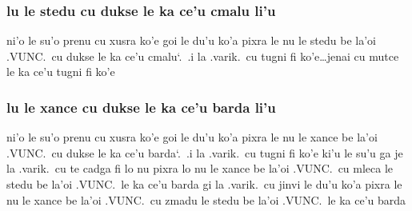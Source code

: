 \documentclass{report}
\newcommand\sds{\spacefactor\sfcode`.\ \space}
\begin{document}
\subsubsection{lu le stedu cu dukse le ka ce'u cmalu li'u}
ni'o le su'o prenu cu xusra ko'e goi le du'u ko'a pixra le nu le stedu be la'oi .VUNC.\ cu dukse le ka ce'u cmalu\sds  .i la .varik.\ cu tugni fi ko'e\ldots jenai cu mutce le ka ce'u tugni fi ko'e

\subsubsection{lu le xance cu dukse le ka ce'u barda li'u}
ni'o le su'o prenu cu xusra ko'e goi le du'u ko'a pixra le nu le xance be la'oi .VUNC.\ cu dukse le ka ce'u barda\sds  .i la .varik.\ cu tugni fi ko'e ki'u le su'u ga je la .varik.\ cu te cadga fi lo nu pixra lo nu le xance be la'oi .VUNC.\ cu mleca le stedu be la'oi .VUNC.\ le ka ce'u barda gi la .varik.\ cu jinvi le du'u ko'a pixra le nu le xance be la'oi .VUNC.\ cu zmadu le stedu be la'oi .VUNC.\ le ka ce'u barda
\end{document}
